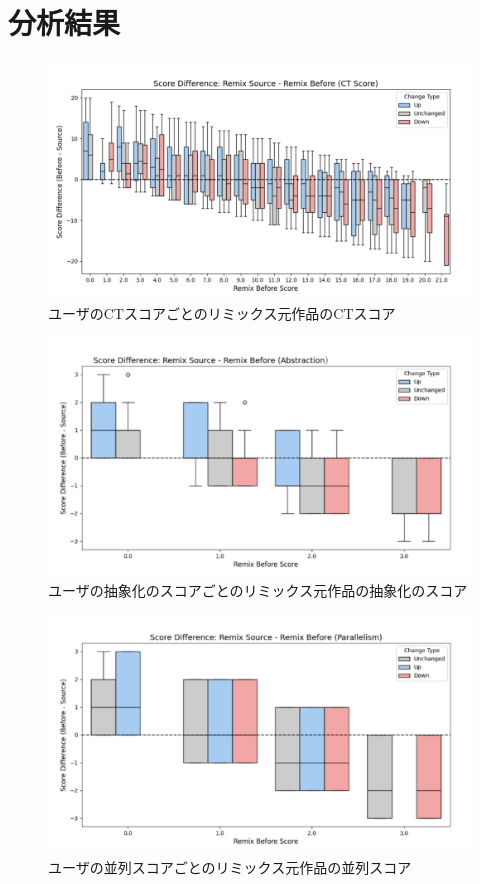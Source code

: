 \documentclass[11pt]{jreport}
\begin{document}
\section{分析結果}


\begin{figure}[h]
\centerline{\includegraphics[width=1.0\linewidth]{@BSthesis2024_Horio/BSthesis2024_Horio_fig/CTscore-boxplot.pdf}}
\caption{ユーザのCTスコアごとのリミックス元作品のCTスコア}
\label{fig:CTscore-boxplot}
\end{figure}
\begin{figure}[h]
\centerline{\includegraphics[width=0.7\linewidth]{@BSthesis2024_Horio/BSthesis2024_Horio_fig/Abstraction-boxplot.pdf}}
\caption{ユーザの抽象化のスコアごとのリミックス元作品の抽象化のスコア}
\label{fig:Abstraction-boxplot}
\end{figure}
\begin{figure}[h]
\centerline{\includegraphics[width=0.7\linewidth]{@BSthesis2024_Horio/BSthesis2024_Horio_fig/Parallelism-boxplot.pdf}}
\caption{ユーザの並列スコアごとのリミックス元作品の並列スコア}
\label{fig:Parallelism-boxplot}
\end{figure}
\end{document}
